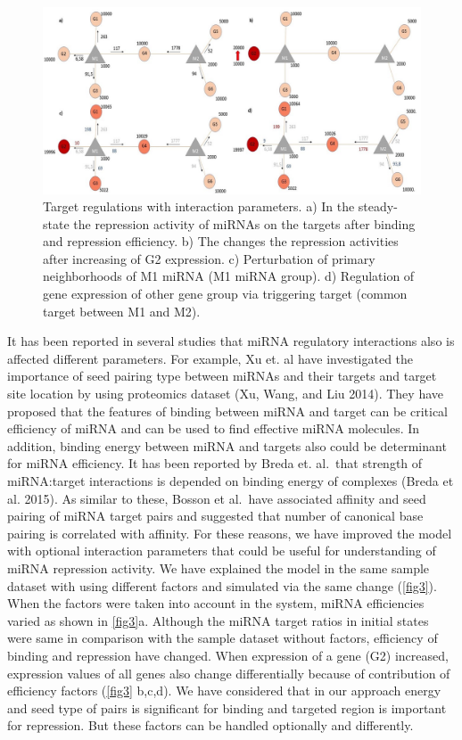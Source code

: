 \documentclass[]{article}
\begin{document}
\begin{figure}
\hypertarget{fig3}{%
\centering
\includegraphics{Fig3.jpg}
\caption{Target regulations with interaction parameters. a) In the
steady-state the repression activity of miRNAs on the targets after
binding and repression efficiency. b) The changes the repression
activities after increasing of G2 expression. c) Perturbation of primary
neighborhoods of M1 miRNA (M1 miRNA group). d) Regulation of gene
expression of other gene group via triggering target (common target
between M1 and M2).}\label{fig3}
}
\end{figure}

It has been reported in several studies that miRNA regulatory
interactions also is affected different parameters. For example, Xu et.
al have investigated the importance of seed pairing type between miRNAs
and their targets and target site location by using proteomics dataset
(Xu, Wang, and Liu 2014). They have proposed that the features of
binding between miRNA and target can be critical efficiency of miRNA and
can be used to find effective miRNA molecules. In addition, binding
energy between miRNA and targets also could be determinant for miRNA
efficiency. It has been reported by Breda et. al.~that strength of
miRNA:target interactions is depended on binding energy of complexes
(Breda et al. 2015). As similar to these, Bosson et al.~have associated
affinity and seed pairing of miRNA target pairs and suggested that
number of canonical base pairing is correlated with affinity. For these
reasons, we have improved the model with optional interaction parameters
that could be useful for understanding of miRNA repression activity. We
have explained the model in the same sample dataset with using different
factors and simulated via the same change (\autoref{fig3}). When the
factors were taken into account in the system, miRNA efficiencies varied
as shown in \autoref{fig3}a. Although the miRNA target ratios in initial
states were same in comparison with the sample dataset without factors,
efficiency of binding and repression have changed. When expression of a
gene (G2) increased, expression values of all genes also change
differentially because of contribution of efficiency factors
(\autoref{fig3} b,c,d). We have considered that in our approach energy
and seed type of pairs is significant for binding and targeted region is
important for repression. But these factors can be handled optionally
and differently.
\end{document}
